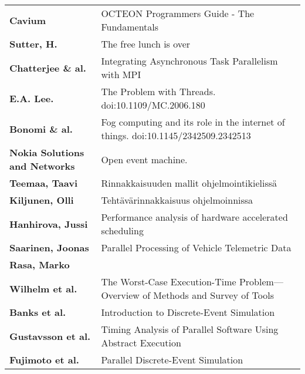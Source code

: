 \begin{table}[h]
  \centering
  \begin{tabular}{@{}l|p{8cm}@{}}
    \toprule

    \textbf{Cavium} & OCTEON Programmers Guide - The Fundamentals \\
    \textbf{Sutter, H.} & The free lunch is over \\
    \textbf{Chatterjee \& al.} & Integrating Asynchronous Task Parallelism with MPI \\
    \textbf{E.A. Lee.} & The Problem with Threads. doi:10.1109/MC.2006.180 \\
    \textbf{Bonomi \& al.} &Fog computing and its role in the internet of things. doi:10.1145/2342509.2342513 \\
    \textbf{Nokia Solutions and Networks} & Open event machine. \\

    \midrule

    \textbf{Teemaa, Taavi} & Rinnakkaisuuden mallit ohjelmointikielissä \\
    \textbf{Kiljunen, Olli} & Tehtävärinnakkaisuus ohjelmoinnissa \\

    \midrule

    \textbf{Hanhirova, Jussi} & Performance analysis of hardware accelerated scheduling \\
    \textbf{Saarinen, Joonas} & Parallel Processing of Vehicle Telemetric Data \\
    \textbf{Rasa, Marko} & \\

    \midrule

    \textbf{Wilhelm et al.} & The Worst-Case Execution-Time Problem—Overview of Methods and Survey of Tools \\
    \textbf{Banks et al.} & Introduction to Discrete-Event Simulation \\
    \textbf{Gustavsson et al.} & Timing Analysis of Parallel Software Using Abstract Execution \\
    \textbf{Fujimoto et al.} & Parallel Discrete-Event Simulation \\

    \bottomrule
  \end{tabular}
\end{table}

